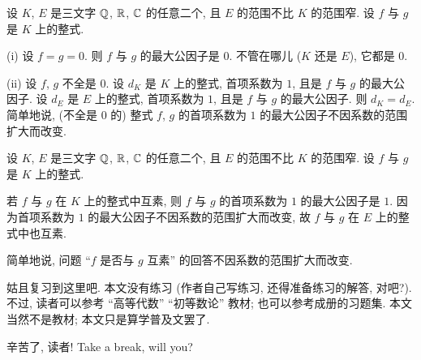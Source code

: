 \begin{proposition}
    设 $K$, $E$ 是三文字 $\mathbb{Q}$, $\mathbb{R}$, $\mathbb{C}$ 的任意二个, 且 $E$ 的范围不比 $K$ 的范围窄. 设 $f$ 与 $g$ 是 $K$ 上的整式.

    (i) 设 $f = g = 0$. 则 $f$ 与 $g$ 的最大公因子是 $0$. 不管在哪儿 ($K$ 还是 $E$), 它都是 $0$.

    (ii) 设 $f$, $g$ 不全是 $0$. 设 $d_K$ 是 $K$ 上的整式, 首项系数为 $1$, 且是 $f$ 与 $g$ 的最大公因子. 设 $d_E$ 是 $E$ 上的整式, 首项系数为 $1$, 且是 $f$ 与 $g$ 的最大公因子. 则 $d_K = d_E$. 简单地说, (不全是 $0$ 的) 整式 $f$, $g$ 的首项系数为 $1$ 的最大公因子不因系数的范围扩大而改变.
\end{proposition}

\begin{proposition}
    设 $K$, $E$ 是三文字 $\mathbb{Q}$, $\mathbb{R}$, $\mathbb{C}$ 的任意二个, 且 $E$ 的范围不比 $K$ 的范围窄. 设 $f$ 与 $g$ 是 $K$ 上的整式.

    若 $f$ 与 $g$ 在 $K$ 上的整式中互素, 则 $f$ 与 $g$ 的首项系数为 $1$ 的最大公因子是 $1$. 因为首项系数为 $1$ 的最大公因子不因系数的范围扩大而改变, 故 $f$ 与 $g$ 在 $E$ 上的整式中也互素.

    简单地说, 问题 ``$f$ 是否与 $g$ 互素'' 的回答不因系数的范围扩大而改变.
\end{proposition}

姑且复习到这里吧. 本文没有练习 (作者自己写练习, 还得准备练习的解答, 对吧?). 不过, 读者可以参考 ``高等代数'' ``初等数论'' 教材; 也可以参考成册的习题集. 本文当然不是教材; 本文只是算学普及文罢了.

辛苦了, 读者! Take a break, will you?
